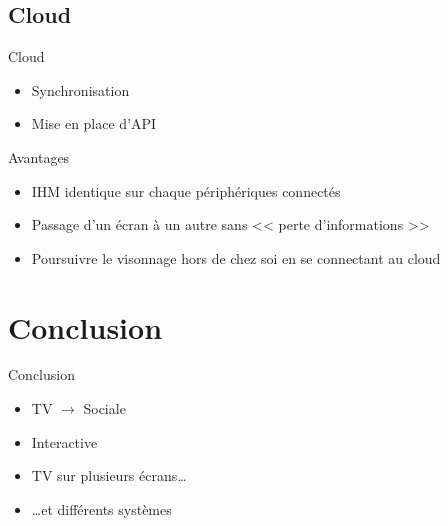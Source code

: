 \documentclass{beamer}
\begin{document}
	\subsection{Cloud}
	\begin{frame}{Cloud}
		\begin{itemize}
			\item Synchronisation
			\item Mise en place d'API
		\end{itemize}
		\begin{exampleblock}{Avantages}
			\begin{itemize}
				\item IHM identique sur chaque périphériques connectés
				\item Passage d'un écran à un autre sans << perte d'informations >>
				\item Poursuivre le visonnage hors de chez soi en se connectant au cloud
			\end{itemize}
		\end{exampleblock}
	\end{frame}

	\section*{Conclusion}
	\begin{frame}{Conclusion}
		\begin{itemize}
			\item TV $\rightarrow$ Sociale
			\item Interactive
			\item TV sur plusieurs écrans\ldots
			\item \ldots et différents systèmes
		\end{itemize}
	\end{frame}

	\begin{frame}
		\titlepage	
	\end{frame}
\end{document}
